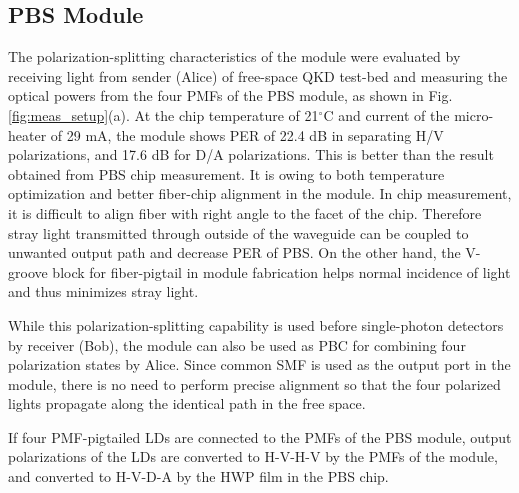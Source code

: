 \documentclass[letterpaper, 10pt]{article}
\begin{document}
\subsection{PBS Module}

The polarization-splitting characteristics of the module were evaluated by receiving light from sender (Alice) of free-space QKD test-bed and measuring the optical powers from the four PMFs of the PBS module, as shown in Fig. \ref{fig:meas_setup}(a).
At the chip temperature of 21$^\circ$C and current of the micro-heater of 29 mA, the module shows PER of 22.4 dB in separating H/V polarizations, and 17.6 dB for D/A polarizations.
This is better than the result obtained from PBS chip measurement.
It is owing to both temperature optimization and better fiber-chip alignment in the module.
In chip measurement, it is difficult to align fiber with right angle to the facet of the chip.
Therefore stray light transmitted through outside of the waveguide can be coupled to unwanted output path and decrease PER of PBS.
On the other hand, the V-groove block for fiber-pigtail in module fabrication helps normal incidence of light and thus minimizes stray light.

While this polarization-splitting capability is used before single-photon detectors by receiver (Bob), the module can also be used as PBC for combining four polarization states by Alice.
Since common SMF is used as the output port in the module, there is no need to perform precise alignment so that the four polarized lights propagate along the identical path in the free space.

If four PMF-pigtailed LDs are connected to the PMFs of the PBS module, output polarizations of the LDs are converted to H-V-H-V  by the PMFs of the module, and converted to  H-V-D-A  by the HWP film in the PBS chip.
\end{document}
